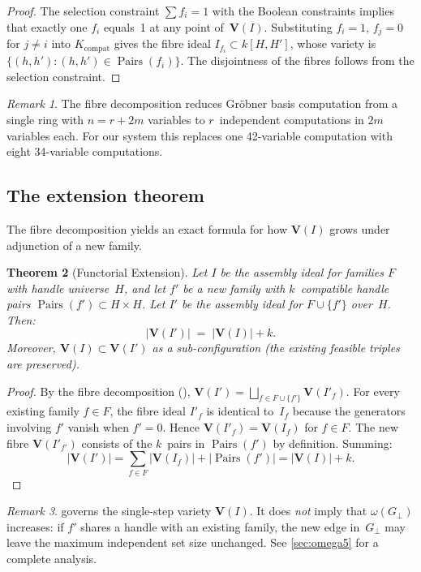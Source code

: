 \documentclass[preprint,12pt]{elsarticle}
\newtheorem{theorem}{Theorem}[section]
\theoremstyle{definition}
\theoremstyle{remark}
\newtheorem{remark}[theorem]{Remark}
\newcommand{\kk}{k}
\newcommand{\Var}{\mathbf{V}}
\DeclareMathOperator{\Pairs}{Pairs}
\begin{document}
\begin{proof}
The selection constraint $\sum f_i = 1$ with the Boolean
constraints implies that exactly one $f_i$ equals~1 at any
point of~$\Var(I)$.  Substituting $f_i = 1$, $f_j = 0$ for
$j \neq i$ into $K_{\mathrm{compat}}$ gives the fibre ideal
$I_{f_i} \subset \kk[H, H']$, whose variety is
$\{(h, h') : (h, h') \in \Pairs(f_i)\}$.  The disjointness
of the fibres follows from the selection constraint.
\end{proof}

\begin{remark}\label{rem:fibre-scalability}
The fibre decomposition reduces Gr\"obner basis computation
from a single ring with $n = r + 2m$ variables to $r$~independent
computations in $2m$ variables each.  For our system this
replaces one 42-variable computation with eight 34-variable
computations.
\end{remark}

\subsection{The extension theorem}

The fibre decomposition yields an exact formula for how $\Var(I)$
grows under adjunction of a new family.

\begin{theorem}[Functorial Extension]\label{thm:extension}
Let $I$ be the assembly ideal for families $F$ with handle universe~$H$,
and let $f'$ be a new family with $k$~compatible handle pairs
$\Pairs(f') \subset H \times H$.  Let $I'$ be the assembly
ideal for $F \cup \{f'\}$ over~$H$.  Then:
\[
  |\Var(I')| \;=\; |\Var(I)| + k.
\]
Moreover, $\Var(I) \subset \Var(I')$ as a sub-configuration
(the existing feasible triples are preserved).
\end{theorem}

\begin{proof}
By the fibre decomposition (),
$\Var(I') = \bigsqcup_{f \in F \cup \{f'\}} \Var(I'_f)$.
For every existing family $f \in F$, the fibre ideal $I'_f$
is identical to~$I_f$ because the generators involving $f'$
vanish when $f' = 0$.  Hence $\Var(I'_f) = \Var(I_f)$ for
$f \in F$.  The new fibre $\Var(I'_{f'})$ consists of the
$k$~pairs in $\Pairs(f')$ by definition.  Summing:
\[
  |\Var(I')| = \sum_{f \in F} |\Var(I_f)| + |\Pairs(f')|
  = |\Var(I)| + k.\]
\end{proof}

\begin{remark}\label{rem:extension-omega}
 governs the single-step variety
$\Var(I)$.  It does \emph{not} imply that $\omega(G_\perp)$
increases: if $f'$ shares a handle with an existing family,
the new edge in~$G_\perp$ may leave the maximum independent
set size unchanged.  See \cref{sec:omega5} for a complete analysis.
\end{remark}
\end{document}
